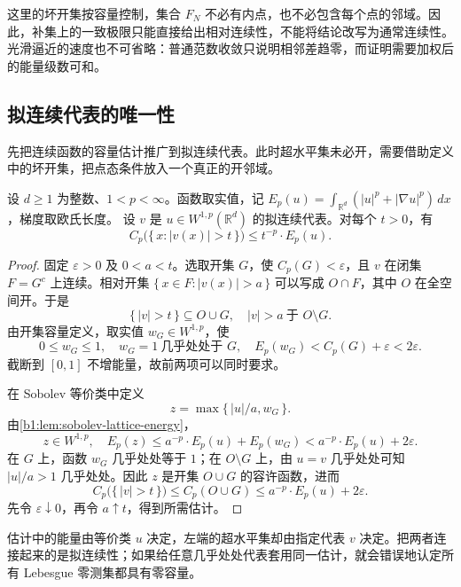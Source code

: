 这里的坏开集按容量控制，集合 \(F_N\) 不必有内点，也不必包含每个点的邻域。因此，补集上的一致极限只能直接给出相对连续性，不能将结论改写为通常连续性。光滑逼近的速度也不可省略：普通范数收敛只说明相邻差趋零，而证明需要加权后的能量级数可和。

\subsection{拟连续代表的唯一性}
\label{b1:subsec:260203}

先把连续函数的容量估计推广到拟连续代表。此时超水平集未必开，需要借助定义中的坏开集，把点态条件放入一个真正的开邻域。

\begin{proposition}\label{b1:prop:quasicontinuous-capacity-level-set}
设 \(d\geq1\) 为整数、\(1<p<\infty\)。函数取实值，记 \(E_p(u)=\int_{\mathbb R^d}(|u|^p+|\nabla u|^p)\,dx\)，梯度取欧氏长度。
设 \(v\) 是 \(u\in W^{1,p}(\mathbb R^d)\) 的拟连续代表。对每个 \(t>0\)，有
\begin{equation}\label{b1:eq:quasicontinuous-capacity-level-set}
 C_p\bigl(\{\,x:|v(x)|>t\,\}\bigr)
 \leq t^{-p}\cdot E_p(u).
\end{equation}
\end{proposition}
\begin{proof}
固定 \(\varepsilon>0\) 及 \(0<a<t\)。选取开集 \(G\)，使
\(C_p(G)<\varepsilon\)，且 \(v\) 在闭集 \(F=G^c\) 上连续。相对开集
\(\{\,x\in F:|v(x)|>a\,\}\) 可以写成 \(O\cap F\)，其中 \(O\) 在全空间开。于是
\[
 \{\,|v|>t\,\}\subseteq O\cup G,\quad
 |v|>a\ \text{于 }O\setminus G.
\]
由开集容量定义，取实值 \(w_G\in W^{1,p}\)，使
\[
 0\leq w_G\leq1,\quad
 w_G=1\ \text{几乎处处于 }G,\quad
 E_p(w_G)<C_p(G)+\varepsilon<2\varepsilon.
\]
截断到 \([0,1]\) 不增能量，故前两项可以同时要求。

在 Sobolev 等价类中定义
\[
 z=\max\{\,|u|/a,w_G\,\}.
\]
由\cref{b1:lem:sobolev-lattice-energy}，
\[
 z\in W^{1,p},\quad
 E_p(z)\leq a^{-p}\cdot E_p(u)+E_p(w_G)
 <a^{-p}\cdot E_p(u)+2\varepsilon.
\]
在 \(G\) 上，函数 \(w_G\) 几乎处处等于 \(1\)；在 \(O\setminus G\) 上，由 \(u=v\) 几乎处处可知 \(|u|/a>1\) 几乎处处。因此 \(z\) 是开集 \(O\cup G\) 的容许函数，进而
\[
 C_p\bigl(\{\,|v|>t\,\}\bigr)
 \leq C_p(O\cup G)
 \leq a^{-p}\cdot E_p(u)+2\varepsilon.
\]
先令 \(\varepsilon\downarrow0\)，再令 \(a\uparrow t\)，得到所需估计。
\end{proof}

估计中的能量由等价类 \(u\) 决定，左端的超水平集却由指定代表 \(v\) 决定。把两者连接起来的是拟连续性；如果给任意几乎处处代表套用同一估计，就会错误地认定所有 Lebesgue 零测集都具有零容量。

